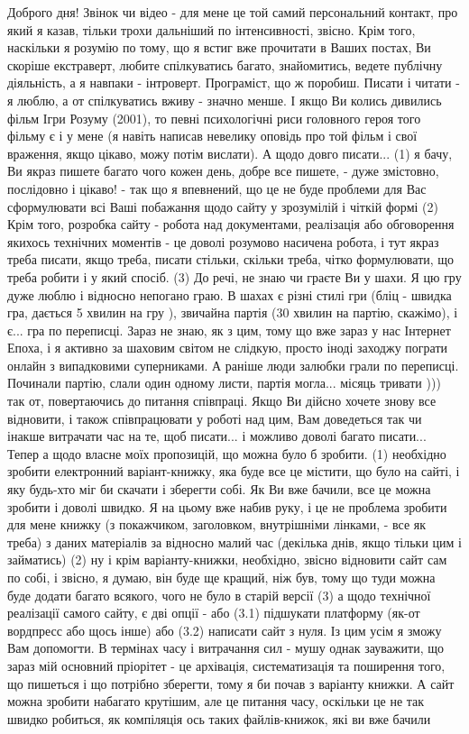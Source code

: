 Доброго дня! Звінок чи відео - для мене це той самий персональний контакт, про який я
казав, тільки трохи дальніший по інтенсивності, звісно. Крім того, наскільки я
розумію по тому, що я встиг вже прочитати в Ваших постах, Ви скоріше
екстраверт, любите спілкуватись багато, знайомитись, ведете публічну діяльність, 
а я навпаки - інтроверт. Програміст, що ж поробиш. Писати і читати
- я люблю, а от спілкуватись вживу - значно менше. І якщо Ви колись дивились
фільм Ігри Розуму (2001), то певні психологічні риси головного героя того фільму є і у мене (я навіть
написав невелику оповідь про той фільм і свої враження, якщо цікаво, можу потім
вислати). А щодо довго писати... (1) я бачу, Ви якраз пишете багато чого кожен
день, добре все пишете, - дуже змістовно, послідовно і цікаво! - так що я
впевнений, що це не буде проблеми для Вас сформулювати всі Ваші побажання щодо
сайту у зрозумілій і чіткій формі (2) Крім того, розробка сайту - робота над
документами, реалізація або обговорення якихось технічних моментів  - це доволі
розумово насичена робота, і тут якраз треба писати, якщо треба, писати стільки,
скільки треба, чітко формулювати, що треба робити і у який спосіб. (3) До речі,
не знаю чи граєте Ви у шахи. Я цю гру дуже люблю і відносно непогано граю. В
шахах є різні стилі гри (бліц - швидка гра, дається 5 хвилин на гру ), звичайна
партія (30 хвилин на партію, скажімо), і є... гра по переписці. Зараз не знаю,
як з цим, тому що вже зараз у нас Інтернет Епоха, і я активно за шаховим світом не слідкую,
просто іноді заходжу пограти онлайн з випадковими суперниками. А раніше люди залюбки грали
по переписці.  Починали партію, слали один одному листи, партія могла... місяць
тривати ))) так от, повертаючись до питання співпраці. Якщо Ви дійсно хочете
знову все відновити, і також співпрацювати у роботі над цим, Вам доведеться так
чи інакше витрачати час на те, щоб писати... і можливо доволі багато писати...
Тепер а щодо власне моїх пропозицій, що можна було б зробити. (1) необхідно
зробити електронний варіант-книжку, яка буде все це містити, що було на сайті,
і яку будь-хто міг би скачати і зберегти собі. Як Ви вже бачили, все це можна
зробити і доволі швидко. Я на цьому вже набив руку, і це не проблема зробити
для мене книжку (з покажчиком, заголовком, внутрішніми лінками, - все як
треба) з даних матеріалів за відносно малий час (декілька днів, якщо тільки цим
і займатись) (2) ну і крім варіанту-книжки, необхідно, звісно відновити сайт
сам по собі, і звісно, я думаю, він буде ще кращий, ніж був, тому що туди можна
буде додати багато всякого, чого не було в старій версії (3) а щодо технічної
реалізації самого сайту, є дві опції - або (3.1) підшукати платформу (як-от
вордпресс або щось інше) або (3.2) написати сайт з нуля. Із цим усім я зможу
Вам допомогти. В термінах часу і витрачання сил - мушу однак зауважити, що
зараз мій основний пріорітет - це архівація, систематизація та поширення того,
що пишеться і що потрібно зберегти, тому я би почав з варіанту книжки. А сайт
можна зробити набагато крутішим, але це питання часу, оскільки це не так швидко
робиться, як компіляція ось таких файлів-книжок, які ви вже бачили
